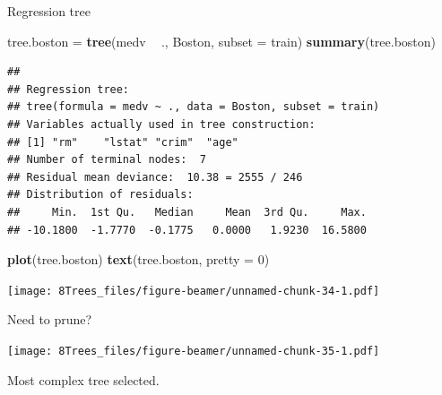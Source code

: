 \documentclass[10pt,ignorenonframetext,]{beamer}
\newenvironment{Shaded}{\begin{snugshade}}{\end{snugshade}}
\newcommand{\KeywordTok}[1]{\textcolor[rgb]{0.13,0.29,0.53}{\textbf{#1}}}
\newcommand{\DataTypeTok}[1]{\textcolor[rgb]{0.13,0.29,0.53}{#1}}
\newcommand{\DecValTok}[1]{\textcolor[rgb]{0.00,0.00,0.81}{#1}}
\newcommand{\StringTok}[1]{\textcolor[rgb]{0.31,0.60,0.02}{#1}}
\newcommand{\OperatorTok}[1]{\textcolor[rgb]{0.81,0.36,0.00}{\textbf{#1}}}
\newcommand{\NormalTok}[1]{#1}
\begin{document}
\begin{frame}[fragile]

\begin{block}{Regression tree}

\begin{Shaded}
\begin{Highlighting}[]
\NormalTok{tree.boston =}\StringTok{ }\KeywordTok{tree}\NormalTok{(medv }\OperatorTok{~}\StringTok{ }\NormalTok{., Boston, }\DataTypeTok{subset =}\NormalTok{ train)}
\KeywordTok{summary}\NormalTok{(tree.boston)}
\end{Highlighting}
\end{Shaded}

\begin{verbatim}
## 
## Regression tree:
## tree(formula = medv ~ ., data = Boston, subset = train)
## Variables actually used in tree construction:
## [1] "rm"    "lstat" "crim"  "age"  
## Number of terminal nodes:  7 
## Residual mean deviance:  10.38 = 2555 / 246 
## Distribution of residuals:
##     Min.  1st Qu.   Median     Mean  3rd Qu.     Max. 
## -10.1800  -1.7770  -0.1775   0.0000   1.9230  16.5800
\end{verbatim}

\begin{Shaded}
\begin{Highlighting}[]
\KeywordTok{plot}\NormalTok{(tree.boston)}
\KeywordTok{text}\NormalTok{(tree.boston, }\DataTypeTok{pretty =} \DecValTok{0}\NormalTok{)}
\end{Highlighting}
\end{Shaded}

\texttt{[image: 8Trees\_files/figure-beamer/unnamed-chunk-34-1.pdf]}

\end{block}

\end{frame}

\begin{frame}[fragile]

\begin{block}{Need to prune?}

\begin{Shaded}
\end{Shaded}

\texttt{[image: 8Trees\_files/figure-beamer/unnamed-chunk-35-1.pdf]}

Most complex tree selected.

\end{block}

\end{frame}
\end{document}
